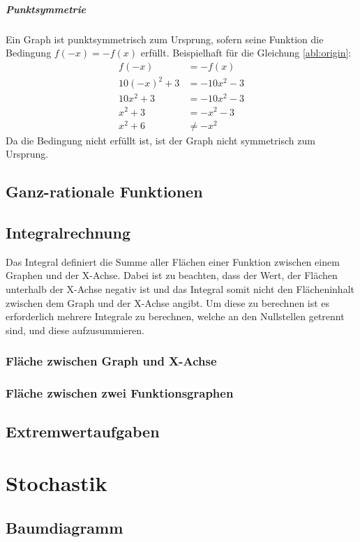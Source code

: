 \documentclass[a4paper]{article}
\begin{document}
				\subparagraph{Punktsymmetrie}
					Ein Graph ist punktsymmetrisch zum Ursprung, sofern seine Funktion die Bedingung $f(-x) = -f(x)$ erfüllt. Beispielhaft für die Gleichung \ref{abl:origin}:
					\begin{equation}
						\begin{split}
							f(-x) &= -f(x)\\
							10(-x)^2+3 &= -10x^2-3\\
							10x^2+3 &= -10x^2-3\\
							x^2+3 &= -x^2-3\\
							x^2+6 &\neq -x^2
						\end{split}
					\end{equation}
					Da die Bedingung nicht erfüllt ist, ist der Graph nicht symmetrisch zum Ursprung.
		\subsection{Ganz-rationale Funktionen}
		\subsection{Integralrechnung}
			Das Integral definiert die Summe aller Flächen einer Funktion zwischen einem Graphen und der X-Achse. Dabei ist zu beachten, dass der Wert, der Flächen unterhalb der X-Achse negativ ist und das Integral somit nicht den Flächeninhalt zwischen dem Graph und der X-Achse angibt. Um diese zu berechnen ist es erforderlich mehrere Integrale zu berechnen, welche an den Nullstellen getrennt sind, und diese aufzusummieren.
			\subsubsection{Fläche zwischen Graph und X-Achse}
			\subsubsection{Fläche zwischen zwei Funktionsgraphen}
		\subsection{Extremwertaufgaben}

	\section{Stochastik}
		\subsection{Baumdiagramm}
\end{document}
